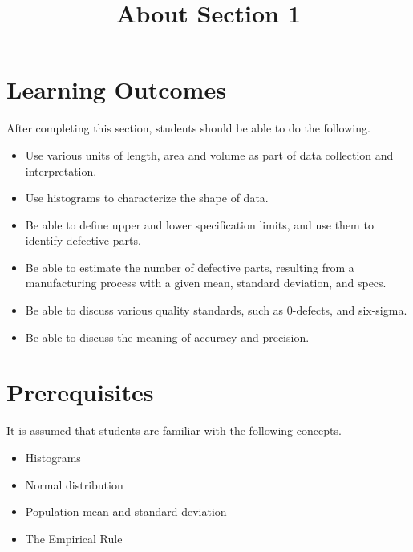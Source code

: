 \documentclass{ximera}
\title{About Section 1}
\begin{document}
\begin{abstract}
\end{abstract}
 
\maketitle
 
\section*{Learning Outcomes}
After completing this section, students should be able to do the following.
 
\begin{itemize}
    \item Use various units of length, area and volume as part of data collection and interpretation.
    \item Use histograms to characterize the shape of data.
    \item Be able to define upper and lower specification limits, and use them to identify defective parts.
    \item Be able to estimate the number of defective parts, resulting from a manufacturing process with a given mean, standard deviation, and specs.
    \item Be able to discuss various quality standards, such as 0-defects, and six-sigma.
    \item Be able to discuss the meaning of accuracy and precision.
   \end{itemize}

   \section*{Prerequisites}
   It is assumed that students are familiar with the following concepts.
   \begin{itemize}
       \item Histograms
       \item Normal distribution
       \item Population mean and standard deviation
       \item The Empirical Rule
   \end{itemize}
 
\end{document}

